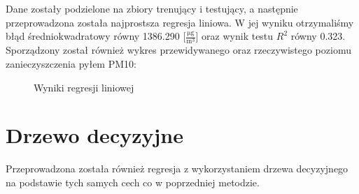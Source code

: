 \documentclass{article}
\begin{document}
	Dane zostały podzielone na zbiory trenujący i testujący, a następnie przeprowadzona została najprostsza regresja liniowa. W jej wyniku otrzymaliśmy błąd średniokwadratowy równy 1386.290 [$\frac{\si{\micro\gram}}{\si\meter^3}$] oraz wynik testu $R^2$ równy 0.323. Sporządzony został również wykres przewidywanego oraz rzeczywistego poziomu zanieczyszczenia pyłem PM10:
	\begin{figure}[!ht]
		\centering
		\caption{Wyniki regresji liniowej}
	\end{figure}
	\FloatBarrier
	
	\section{Drzewo decyzyjne}
	Przeprowadzona została również regresja z wykorzystaniem drzewa decyzyjnego na podstawie tych samych cech co w poprzedniej metodzie. 
	
\end{document}
